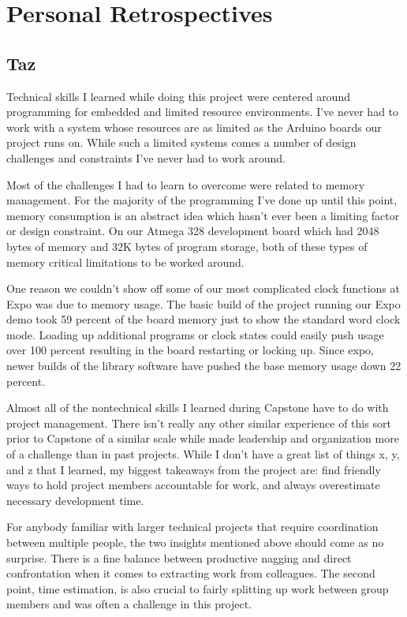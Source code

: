 \documentclass[onecolumn, draftclsnofoot,10pt, compsoc]{IEEEtran}
\begin{document}
\section{Personal Retrospectives}
\subsection{Taz}
Technical skills I learned while doing this project were centered around programming for embedded and limited resource environments.
I’ve never had to work with a system whose resources are as limited as the Arduino boards our project runs on.
While such a limited systems comes a number of design challenges and constraints I’ve never had to work around.
 
Most of the challenges I had to learn to overcome were related to memory management.
For the majority of the programming I’ve done up until this point, memory consumption is an abstract idea which hasn’t ever been a limiting factor or design constraint.
On our Atmega 328 development board which had 2048 bytes of memory and 32K bytes of program storage, both of these types of memory critical limitations to be worked around.
 
One reason we couldn’t show off some of our most complicated clock functions at Expo was due to memory usage.
The basic build of the project running our Expo demo took 59 percent of the board memory just to show the standard word clock mode.
Loading up additional programs or clock states could easily push usage over 100 percent resulting in the board restarting or locking up.
Since expo, newer builds of the library software have pushed the base memory usage down 22 percent.
 
Almost all of the nontechnical skills I learned during Capstone have to do with project management. There isn’t really any other similar experience of this sort prior to Capstone of a similar scale while made leadership and organization more of a challenge than in past projects.
While I don’t have a great list of things x, y, and z that I learned, my biggest takeaways from the project are: find friendly ways to hold project members accountable for work, and always overestimate necessary development time.
 
For anybody familiar with larger technical projects that require coordination between multiple people, the two insights mentioned above should come as no surprise.
There is a fine balance between productive nagging and direct confrontation when it comes to extracting work from colleagues.
The second point, time estimation, is also crucial to fairly splitting up work between group members and was often a challenge in this project.
 
\end{document}
